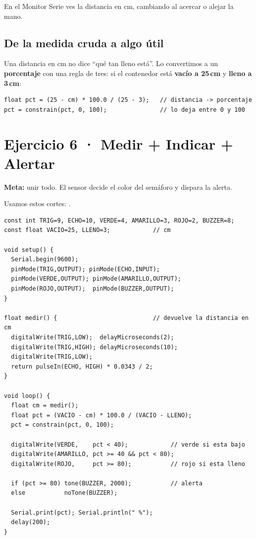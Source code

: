 \documentclass[10pt,letterpaper]{article}
\newcommand{\chip}[2]{\tcbox[on line, colback=#1, colframe=#1, boxrule=0pt,
  arc=0.6mm, left=2mm, right=2mm, top=0.4mm, bottom=0.4mm]{\footnotesize\bfseries\textcolor{white}{#2}}}
\begin{document}
\begin{veras}En el Monitor Serie ves la distancia en cm, cambiando al acercar o alejar la mano.\end{veras}

\subsection{De la medida cruda a algo útil}
Una distancia en cm no dice ``qué tan lleno está''. Lo convertimos a un \textbf{porcentaje} con una
regla de tres: si el contenedor está \textbf{vacío a 25\,cm} y \textbf{lleno a 3\,cm}:
\begin{lstlisting}[style=arduino]
float pct = (25 - cm) * 100.0 / (25 - 3);   // distancia -> porcentaje
pct = constrain(pct, 0, 100);               // lo deja entre 0 y 100
\end{lstlisting}

\section{Ejercicio 6 · Medir + Indicar + Alertar}
\begin{objetivo}\textbf{Meta:} unir todo. El sensor decide el color del semáforo y dispara la
alerta.\end{objetivo}

Usamos estos cortes: \;\chip{AIEPGreen}{< 40\%}\; \chip{AIEPAmber}{40--80\%}\;
\chip{AIEPRed}{$\geq$ 80\%}.

\begin{lstlisting}[style=arduino]
const int TRIG=9, ECHO=10, VERDE=4, AMARILLO=3, ROJO=2, BUZZER=8;
const float VACIO=25, LLENO=3;            // cm

void setup() {
  Serial.begin(9600);
  pinMode(TRIG,OUTPUT); pinMode(ECHO,INPUT);
  pinMode(VERDE,OUTPUT); pinMode(AMARILLO,OUTPUT);
  pinMode(ROJO,OUTPUT);  pinMode(BUZZER,OUTPUT);
}

float medir() {                           // devuelve la distancia en cm
  digitalWrite(TRIG,LOW);  delayMicroseconds(2);
  digitalWrite(TRIG,HIGH); delayMicroseconds(10);
  digitalWrite(TRIG,LOW);
  return pulseIn(ECHO, HIGH) * 0.0343 / 2;
}

void loop() {
  float cm = medir();
  float pct = (VACIO - cm) * 100.0 / (VACIO - LLENO);
  pct = constrain(pct, 0, 100);

  digitalWrite(VERDE,    pct < 40);            // verde si esta bajo
  digitalWrite(AMARILLO, pct >= 40 && pct < 80);
  digitalWrite(ROJO,     pct >= 80);           // rojo si esta lleno

  if (pct >= 80) tone(BUZZER, 2000);           // alerta
  else           noTone(BUZZER);

  Serial.print(pct); Serial.println(" %");
  delay(200);
}
\end{lstlisting}
\end{document}
